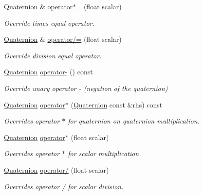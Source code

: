 \begin{DoxyCompactItemize}
\hyperlink{structMathUtil_1_1Quaternion}{Quaternion} \& \hyperlink{structMathUtil_1_1Quaternion_aa8d8617b9a2968e7731244ed983506aa}{operator$\ast$=} (float scalar)
\begin{DoxyCompactList}\small\item\em Override times equal operator. \end{DoxyCompactList}\item 
\hyperlink{structMathUtil_1_1Quaternion}{Quaternion} \& \hyperlink{structMathUtil_1_1Quaternion_ac585108f7346eb49bb379fd07035e5b9}{operator/=} (float scalar)
\begin{DoxyCompactList}\small\item\em Override division equal operator. \end{DoxyCompactList}\item 
\hyperlink{structMathUtil_1_1Quaternion}{Quaternion} \hyperlink{structMathUtil_1_1Quaternion_a638a9680ea6bdb6fbd65d6ee5abd2708}{operator-\/} () const
\begin{DoxyCompactList}\small\item\em Override unary operator -\/ (negation of the quaternion) \end{DoxyCompactList}\item 
\hyperlink{structMathUtil_1_1Quaternion}{Quaternion} \hyperlink{structMathUtil_1_1Quaternion_aab39eda1b4a6960913b0e476e1c00adc}{operator$\ast$} (\hyperlink{structMathUtil_1_1Quaternion}{Quaternion} const \&rhs) const
\begin{DoxyCompactList}\small\item\em Overrides operator $\ast$ for quaternion on quaternion multiplication. \end{DoxyCompactList}\item 
\hyperlink{structMathUtil_1_1Quaternion}{Quaternion} \hyperlink{structMathUtil_1_1Quaternion_af7ed7435e597af9797b5188bba6c8dd1}{operator$\ast$} (float scalar)
\begin{DoxyCompactList}\small\item\em Overrides operator $\ast$ for scalar multiplication. \end{DoxyCompactList}\item 
\hyperlink{structMathUtil_1_1Quaternion}{Quaternion} \hyperlink{structMathUtil_1_1Quaternion_a51b4197ad89c39f9a9e11cc25cc47331}{operator/} (float scalar)
\begin{DoxyCompactList}\small\item\em Overrides operator / for scalar division. \end{DoxyCompactList}\item 

\end{DoxyCompactItemize}

